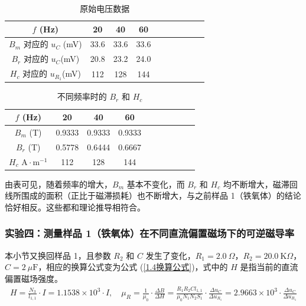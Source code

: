 \documentclass[UTF8]{article}
\def\kO{\ \mathrm{K}\Omega}
\def\uF{\ \mu\mathrm{F}}
\theoremstyle{MyLineTheoremStyle} %
\theoremstyle{MyBlockTheoremStyle} %
\theoremstyle{MySubsubsectionStyle} %
\begin{document}
\vspace*{-5mm}
\begin{center}
    \noindent\begin{minipage}{0.49\columnwidth}
    \begin{table}[H]\centering
        \caption{原始电压数据}
    \begin{tabular}{cccccccccc}\toprule
        $f$ (Hz) & 20 & 40 & 60  \\
        \midrule
        $B_m$ 对应的 $u_{C}$ (mV) & 33.6 & 33.6 & 33.6 \\
        $B_r$ 对应的 $u_{C}$(mV) & 20.8 & 23.2 & 24.0 \\
        $H_c$ 对应的 $u_{R_1}$(mV) & 112  & 128  & 144 \\
        \bottomrule
    \end{tabular}
    \end{table}
\end{minipage}\begin{minipage}{0.49\columnwidth}
    \begin{table}[H]\centering
        \caption{不同频率时的 $B_r$ 和 $H_c$}
        \begin{tabular}{cccccccccc}\toprule
            $f$ (Hz) & 20 & 40 & 60  \\
            \midrule
            $B_m$ (T) & 0.9333 & 0.9333 & 0.9333 \\
            $B_r$ (T) & 0.5778  & 0.6444 & 0.6667 \\
            $H_c$ $\mathrm{A\cdot m^{-1}}$ & 112  & 128  & 144 \\
            \bottomrule
        \end{tabular}
    \end{table}\label{1.3表}
\end{minipage}
\end{center}
由表可见，随着频率的增大，$B_m$ 基本不变化，而 $B_r$ 和 $H_c$ 均不断增大，磁滞回线所围成的面积（正比于磁滞损耗）也不断增大，与之前样品 1（铁氧体）的结论恰好相反。这些都和理论推导相符合。

\subsubsection{实验四：测量样品 1（铁氧体）在不同直流偏置磁场下的可逆磁导率}
本小节又换回样品 1，且参数 $R_2$ 和 $C$ 发生了变化，$R_1 = 2.0 \ \Omega$，$R_2 = 20.0 \kO$，$C = 2 \uF$，相应的换算公式变为公式 (\ref{1.4换算公式})，式中的 $H$ 是指当前的直流偏置磁场强度。
\begin{equation}\label{1.4换算公式}
\begin{matrix}\displaystyle
    H = \frac{N_3}{l_{1,1}}\cdot I = 1.1538 \times 10^3 \cdot I,\quad 
    \mu_R = \frac{1}{\mu_0}\cdot\frac{\Delta B}{\Delta H} = \frac{R_1R_2C l_{1,1}}{\mu_0N_1N_2S_1} \cdot \frac{\Delta u_{C}}{\Delta u_{R_1}} = 2.9663\times 10^{3} \cdot \frac{\Delta u_{C}}{\Delta u_{R_1}}
\end{matrix}
\end{equation}
\end{document}
